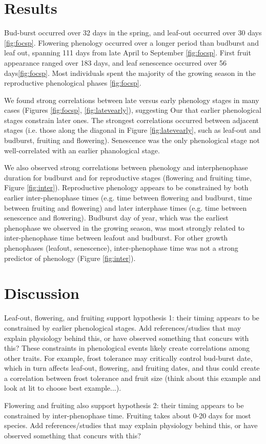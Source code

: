 \documentclass{article}
\begin{document}
\section* {Results}
\par Bud-burst occurred over 32 days in the spring, and leaf-out occurred over 30 days \ref{fig:focsp}. Flowering phenology occurred over a longer period than budburst and leaf out, spanning 111 days from late April to September \ref{fig:focsp}. First fruit appearance ranged over 183 days, and leaf senescence occurred over 56 days\ref{fig:focsp}. Most individuals spent the majority of the growing season in the reproductive phenological phases \ref{fig:focsp}.
\par We found strong correlations between late versus early phenology stages in many cases (Figures \ref{fig:focsp}, \ref{fig:latevearly}), suggesting  Our that earlier phenological stages constrain later ones. The strongest correlations occurred between adjacent stages (i.e. those along the diagonal in Figure \ref{fig:latevearly}, such as leaf-out and budburst, fruiting and flowering). Senescence was the only phenological stage not well-correlated with an earlier phanological stage.
\par We also observed strong correlations between phenology and interphenophase duration for budburst and for reproductive stages (flowering and fruiting time, Figure \ref{fig:inter}). Reproductive phenology appears to be constrained by both earlier inter-phenophase times (e.g. time between flowering and budburst, time between fruiting and flowering) and later interphase times (e.g. time between senescence and flowering). Budburst day of year, which was the earliest phenophase we observed in the growing season, was most strongly related to inter-phenophase time between leafout and budburst. For other growth phenophases (leafout, senescence), inter-phenophase time was not a strong predictor of phenology (Figure \ref{fig:inter}). 

\section* {Discussion}

Leaf-out, flowering, and fruiting support hypothesis 1: their timing appears to be constrained by earlier phenological stages.  
Add references/studies that may explain physiology behind this, or have observed something that concurs with this? These constraints in phenological events likely create correlations among other traits. For example, frost tolerance may critically control bud-burst date, which in turn affects leaf-out, flowering, and fruiting dates, and thus could create a correlation between frost tolerance and fruit size (think about this example and look at lit to choose best example...).
\par Flowering and fruiting also support hypothesis 2: their timing appears to be constrained by inter-phenophase time. Fruiting takes about 0-20 days for most species. Add references/studies that may explain physiology behind this, or have observed something that concurs with this?
\end{document}
